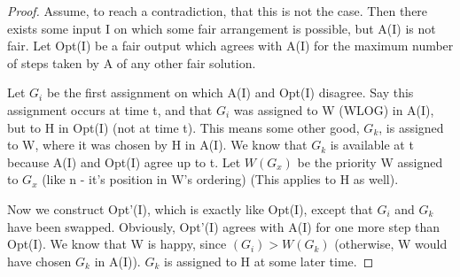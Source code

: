 \documentclass{article}
\begin{document}
	\begin{proof}
		Assume, to reach a contradiction, that this is not the case.
		Then there exists some input I on which some fair arrangement is possible, but A(I) is not fair.
		Let Opt(I) be a fair output which agrees with A(I) for the maximum number of steps taken by A of any other fair solution.
		
		Let $G_i$ be the first assignment on which A(I) and Opt(I) disagree.
		Say this assignment occurs at time t, and that $G_i$ was assigned to W (WLOG) in A(I), but to H in Opt(I) (not at time t).
		This means some other good, $G_k$, is assigned to W, where it was chosen by H in A(I).
		We know that $G_k$ is available at t because A(I) and Opt(I) agree up to t.
		Let $W(G_x)$ be the priority W assigned to $G_x$ (like n - it's position in W's ordering) (This applies to H as well).
		
		Now we construct Opt'(I), which is exactly like Opt(I), except that $G_i$ and $G_k$ have been swapped.
		Obviously, Opt'(I) agrees with A(I) for one more step than Opt(I).
		We know that W is happy, since $(G_i) > W(G_k)$ (otherwise, W would have chosen $G_k$ in A(I)).
		$G_k$ is assigned to H at some later time.
		
	\end{proof}
\end{document}
